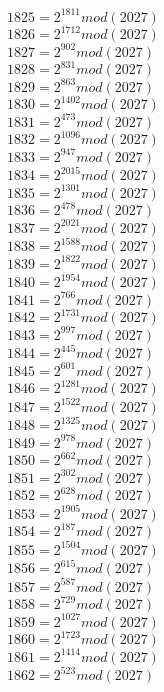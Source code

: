 \documentclass[12pt, letterpaper]{article}
\begin{document}
\begin{itemize}
\begin{multicols}{3}
$1825= 2^{1811} mod (2027)$\\
$1826= 2^{1712} mod (2027)$\\
$1827= 2^{902} mod (2027)$\\
$1828= 2^{831} mod (2027)$\\
$1829= 2^{863} mod (2027)$\\
$1830= 2^{1402} mod (2027)$\\
$1831= 2^{473} mod (2027)$\\
$1832= 2^{1096} mod (2027)$\\
$1833= 2^{947} mod (2027)$\\
$1834= 2^{2015} mod (2027)$\\
$1835= 2^{1301} mod (2027)$\\
$1836= 2^{478} mod (2027)$\\
$1837= 2^{2021} mod (2027)$\\
$1838= 2^{1588} mod (2027)$\\
$1839= 2^{1822} mod (2027)$\\
$1840= 2^{1954} mod (2027)$\\
$1841= 2^{766} mod (2027)$\\
$1842= 2^{1731} mod (2027)$\\
$1843= 2^{997} mod (2027)$\\
$1844= 2^{445} mod (2027)$\\
$1845= 2^{601} mod (2027)$\\
$1846= 2^{1281} mod (2027)$\\
$1847= 2^{1522} mod (2027)$\\
$1848= 2^{1325} mod (2027)$\\
$1849= 2^{978} mod (2027)$\\
$1850= 2^{662} mod (2027)$\\
$1851= 2^{302} mod (2027)$\\
$1852= 2^{628} mod (2027)$\\
$1853= 2^{1905} mod (2027)$\\
$1854= 2^{187} mod (2027)$\\
$1855= 2^{1504} mod (2027)$\\
$1856= 2^{615} mod (2027)$\\
$1857= 2^{587} mod (2027)$\\
$1858= 2^{729} mod (2027)$\\
$1859= 2^{1027} mod (2027)$\\
$1860= 2^{1723} mod (2027)$\\
$1861= 2^{1414} mod (2027)$\\
$1862= 2^{523} mod (2027)$\\

\end{multicols}
\end{itemize}
\end{document}

